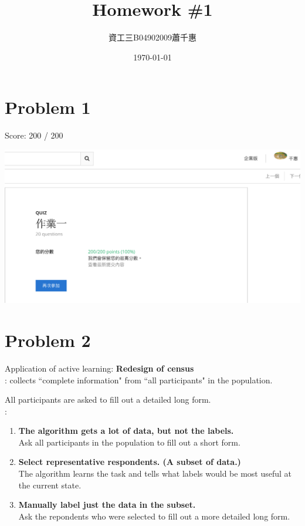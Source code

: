 \documentclass[12pt, a4paper]{article}
\title{\vspace{-4ex}\bf{\LARGE{Homework \#1}}}
\author{資工三\space\space\space B04902009\space\space\space 蕭千惠} %
\date{\vspace{-2ex}\today\vspace{-4ex}}
\begin{document}
	\begin{CJK}{UTF8}{bkai} %
	\maketitle\thispagestyle{fancy}
	\linespread{1.5}
	\fontsize{12pt}{10pt} \selectfont

	\section*{Problem 1}
		Score: 200 / 200 \par
		\includegraphics[width=16.5cm, keepaspectratio=true]{1.png} \\
	\section*{Problem 2}
	\noindent
	Application of active learning: {\bf Redesign of census} \\

	: collects “complete information" from “all participants" in the population. \par
	\hspace{6.5em} All participants are asked to fill out a detailed long form.\\

	:
	\begin{enumerate}
	\item	
		{\bf The algorithm gets a lot of data, but not the labels.} \\
		Ask all participants in the population to fill out a short form. 
	\item
		{\bf Select representative respondents. (A subset of data.)}\\
		The algorithm learns the task and tells what labels would be most useful at the current state.
	\item
		{\bf Manually label just the data in the subset.} \\
	 	Ask the repondents who were selected to fill out a more detailed long form.
	\end{enumerate}
	


\end{CJK}
\end{document}
